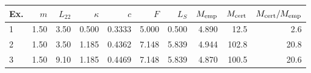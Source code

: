 \begin{tabular}{lrrrrrrrrr}
\toprule
Ex. & $m$ & $L_{22}$ & $\kappa$ & $c$ & $F$ & $L_S$ & $M_{\rm emp}$ & $M_{\rm cert}$ & $M_{\rm cert}/M_{\rm emp}$\\
\midrule
1 & 1.50 & 3.50 & 0.500 & 0.3333 & 5.000 & 0.500 & 4.890 & 12.5 & 2.6\\
2 & 1.50 & 3.50 & 1.185 & 0.4362 & 7.148 & 5.839 & 4.944 & 102.8 & 20.8\\
3 & 1.50 & 9.10 & 1.185 & 0.4469 & 7.148 & 5.839 & 4.870 & 100.5 & 20.6\\
\bottomrule
\end{tabular}